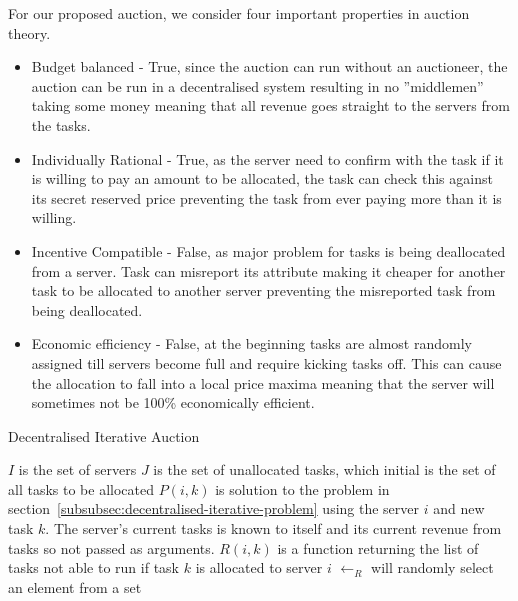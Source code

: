 For our proposed auction, we consider four important properties in auction theory.
\begin{itemize}
    \item Budget balanced - True, since the auction can run without an auctioneer, the auction can be run in a
    decentralised system resulting in no ''middlemen'' taking some money meaning that all revenue goes straight to
    the servers from the tasks.
    \item Individually Rational - True, as the server need to confirm with the task if it is willing to pay an amount
    to be allocated, the task can check this against its secret reserved price preventing the task from ever paying
    more than it is willing.
    \item Incentive Compatible - False, as major problem for tasks is being deallocated from a server. Task can
    misreport its attribute making it cheaper for another task to be allocated to another server preventing the
    misreported task from being deallocated.
    \item Economic efficiency - False, at the beginning tasks are almost randomly assigned till servers become full and
    require kicking tasks off. This can cause the allocation to fall into a local price maxima meaning that the
    server will sometimes not be 100\% economically efficient.
\end{itemize}

\begin{algorithm}[H]
    \caption{Decentralised Iterative Auction}
    \label{alg:dia}
    \begin{algorithmic}
        \REQUIRE $I$ is the set of servers
        \REQUIRE $J$ is the set of unallocated tasks, which initial is the set of all tasks to be allocated
        \REQUIRE $P(i, k)$ is solution to the problem in section~\ref{subsubsec:decentralised-iterative-problem}
        using the server $i$ and new task $k$.
        The server's current tasks is known to itself and its current revenue from tasks so not passed as arguments.
        \REQUIRE $R(i, k)$ is a function returning the list of tasks not able to run if task $k$ is allocated to server $i$
        \REQUIRE $\leftarrow_R$ will randomly select an element from a set
        \ENDFOR
        \ENDIF
        \ENDWHILE
    \end{algorithmic}
\end{algorithm}

